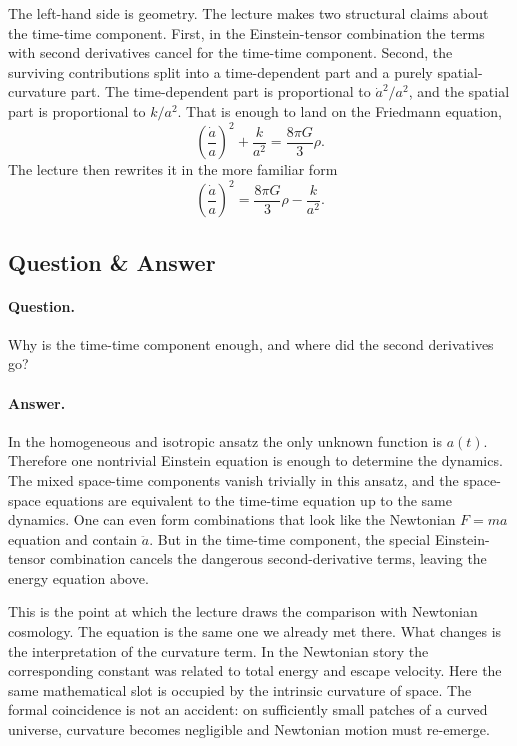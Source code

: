 The left-hand side is geometry. The lecture makes two structural claims about the time-time component. First, in the Einstein-tensor combination the terms with second derivatives cancel for the time-time component. Second, the surviving contributions split into a time-dependent part and a purely spatial-curvature part. The time-dependent part is proportional to \(\dot a^2/a^2\), and the spatial part is proportional to \(k/a^2\). That is enough to land on the Friedmann equation,
\begin{equation}
\left(\frac{\dot a}{a}\right)^2 + \frac{k}{a^2} = \frac{8\pi G}{3}\rho .
\end{equation}
The lecture then rewrites it in the more familiar form
\begin{equation}
\left(\frac{\dot a}{a}\right)^2 = \frac{8\pi G}{3}\rho - \frac{k}{a^2}.
\end{equation}

\subsection{Question \& Answer}

\paragraph{Question.} Why is the time-time component enough, and where did the second derivatives go?

\paragraph{Answer.} In the homogeneous and isotropic ansatz the only unknown function is \(a(t)\). Therefore one nontrivial Einstein equation is enough to determine the dynamics. The mixed space-time components vanish trivially in this ansatz, and the space-space equations are equivalent to the time-time equation up to the same dynamics. One can even form combinations that look like the Newtonian \(F=ma\) equation and contain \(\ddot a\). But in the time-time component, the special Einstein-tensor combination cancels the dangerous second-derivative terms, leaving the energy equation above.

This is the point at which the lecture draws the comparison with Newtonian cosmology. The equation is the same one we already met there. What changes is the interpretation of the curvature term. In the Newtonian story the corresponding constant was related to total energy and escape velocity. Here the same mathematical slot is occupied by the intrinsic curvature of space. The formal coincidence is not an accident: on sufficiently small patches of a curved universe, curvature becomes negligible and Newtonian motion must re-emerge.

